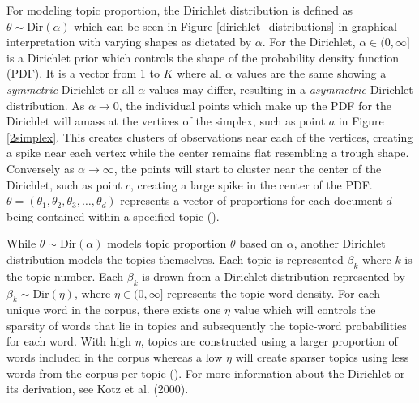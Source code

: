 \documentclass[a4paper, 12pt, twoside]{article}
\numberwithin{equation}{section} %
\begin{document}
For modeling topic proportion, the Dirichlet distribution is defined as $\theta \sim \text{Dir}(\alpha)$ which can be seen in Figure \ref{dirichlet_distributions} in graphical interpretation with varying shapes as dictated by $\alpha$. For the Dirichlet, $\alpha \in (0,\infty]$ is a Dirichlet prior which controls the shape of the probability density function (PDF). It is a vector from 1 to $K$ where all $\alpha$ values are the same showing a \textit{symmetric} Dirichlet or all $\alpha$ values may differ, resulting in a \textit{asymmetric} Dirichlet distribution. As $\alpha \to 0$, the individual points which make up the PDF for the Dirichlet will amass at the vertices of the simplex, such as point $a$ in Figure \ref{2simplex}. This creates clusters of observations near each of the vertices, creating a spike near each vertex while the center remains flat resembling a trough shape. Conversely as $\alpha \to \infty$, the points will start to cluster near the center of the Dirichlet, such as point $c$, creating a large spike in the center of the PDF. $\theta = (\theta_1, \theta_2, \theta_3, \ldots, \theta_d)$ represents a vector of proportions for each document $d$ being contained within a specified topic (\cite{blei2003}). 

While $\theta \sim \text{Dir}(\alpha)$ models topic proportion $\theta$ based on $\alpha$, another Dirichlet distribution models the topics themselves. Each topic is represented $\beta_k$ where $k$ is the topic number. Each $\beta_k$ is drawn from a Dirichlet distribution represented by $\beta_k \sim \text{Dir}(\eta)$, where $\eta \in (0,\infty]$ represents the topic-word density. For each unique word in the corpus, there exists one $\eta$ value which will controls the sparsity of words that lie in topics and subsequently the topic-word probabilities for each word. With high $\eta$, topics are constructed using a larger proportion of words included in the corpus whereas a low $\eta$ will create sparser topics using less words from the corpus per topic (\cite{blei2003}). For more information about the Dirichlet or its derivation, see Kotz et al. (2000).
\end{document}
